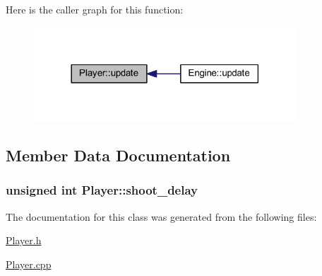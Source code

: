 Here is the caller graph for this function\+:\nopagebreak
\begin{figure}[H]
\begin{center}
\leavevmode
\includegraphics[width=278pt]{class_player_a82c3476f3e65a4e2ac6bcd040771bdd4_icgraph}
\end{center}
\end{figure}




\subsection{Member Data Documentation}
\hypertarget{class_player_ab6e35dfaece8703f3906fc3a09d61078}{}
\subsubsection[{shoot\+\_\+delay}]{\setlength{\rightskip}{0pt plus 5cm}unsigned int Player\+::shoot\+\_\+delay\hspace{0.3cm}{\ttfamily [protected]}}\label{class_player_ab6e35dfaece8703f3906fc3a09d61078}


The documentation for this class was generated from the following files\+:\begin{DoxyCompactItemize}
\item 
\hyperlink{_player_8h}{Player.\+h}\item 
\hyperlink{_player_8cpp}{Player.\+cpp}\end{DoxyCompactItemize}
